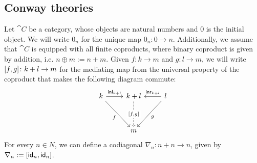 \subsection{Conway theories}\label{c3:subsec:conway}
Let $\cat{C}$ be a category, whose objects are natural numbers and $0$ is the initial object. We will write $0_n$ for the unique map $0_n \colon 0 \to n$. Additionally, we assume that $\cat{C}$ is equipped with all finite coproducts, where binary coproduct is given by addition, i.e. $n \oplus m := n + m$. Given $f \colon k \to m$ and $g \colon l \to m$, we will write $[ f,g ] \colon k +l \to m$ for the mediating map from the universal property of the coproduct that makes the following diagram commute:
\begin{equation}\label{eqn:mediating}
\begin{tikzcd}
	k & {k+l} & l \\
	\\
	& m
	\arrow["{\inl_{k + l}}", from=1-1, to=1-2]
	\arrow["f"', from=1-1, to=3-2]
	\arrow["{[f,g]}"{description}, dashed, from=1-2, to=3-2]
	\arrow["{\inr_{k + l}}"', from=1-3, to=1-2]
	\arrow["g", from=1-3, to=3-2]
\end{tikzcd}
\end{equation}
For every $n \in N$, we can define a codiagonal $\nabla_{n} \colon n + n \to n$, given by $\nabla_n := [\mathsf{id}_n,\mathsf{id}_n]$.

